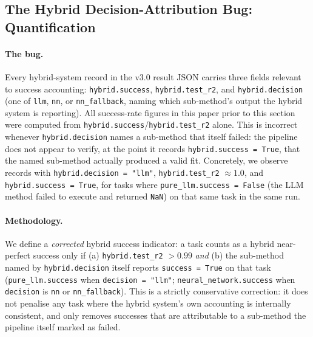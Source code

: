 \documentclass[twoside,11pt]{article}
\begin{document}
\subsection{The Hybrid Decision-Attribution Bug: Quantification}
\label{sec:hybrid-attribution-bug}

\paragraph{The bug.} Every hybrid-system record in the v3.0 result JSON carries
three fields relevant to success accounting: \texttt{hybrid.success},
\texttt{hybrid.test\_r2}, and \texttt{hybrid.decision} (one of \texttt{llm},
\texttt{nn}, or \texttt{nn\_fallback}, naming which sub-method's output the
hybrid system is reporting). All success-rate figures in this paper prior to
this section were computed from \texttt{hybrid.success}/\texttt{hybrid.test\_r2}
alone. This is incorrect whenever \texttt{hybrid.decision} names a sub-method
that itself failed: the pipeline does not appear to verify, at the point it
records \texttt{hybrid.success = True}, that the named sub-method actually
produced a valid fit. Concretely, we observe records with
\texttt{hybrid.decision = "llm"}, \texttt{hybrid.test\_r2} $\approx 1.0$, and
\texttt{hybrid.success = True}, for tasks where \texttt{pure\_llm.success =
False} (the LLM method failed to execute and returned \texttt{NaN}) on that
same task in the same run.

\paragraph{Methodology.} We define a \emph{corrected} hybrid success indicator:
a task counts as a hybrid near-perfect success only if (a)
\texttt{hybrid.test\_r2} $> 0.99$ \emph{and} (b) the sub-method named by
\texttt{hybrid.decision} itself reports \texttt{success = True} on that task
(\texttt{pure\_llm.success} when \texttt{decision = "llm"};
\texttt{neural\_network.success} when \texttt{decision} is \texttt{nn} or
\texttt{nn\_fallback}). This is a strictly conservative correction: it does
not penalise any task where the hybrid system's own accounting is internally
consistent, and only removes successes that are attributable to a sub-method
the pipeline itself marked as failed.
\end{document}
